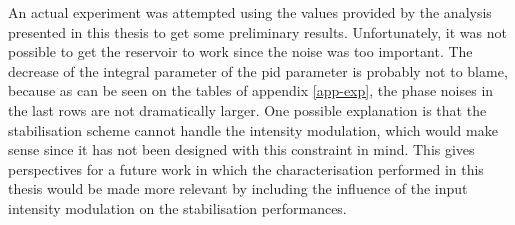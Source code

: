 An actual \rcer experiment was attempted using the values provided by the analysis presented in this thesis to get some preliminary results. Unfortunately, it was not possible to get the reservoir to work since the noise was too important. The decrease of the integral parameter of the \gls{pid} parameter is probably not to blame, because as can be seen on the tables of appendix \ref{app-exp}, the phase noises in the last rows are not dramatically larger. One possible explanation is that the stabilisation scheme cannot handle the intensity modulation, which would make sense since it has not been designed with this constraint in mind. This gives perspectives for a future work in which the characterisation performed in this thesis would be made more relevant by including the influence of the input intensity modulation on the stabilisation performances.